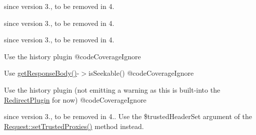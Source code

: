 \begin{DoxyRefList}
%
since version 3., to be removed in 4.  
\item[Global \mbox{\hyperlink{class_symfony_1_1_component_1_1_http_foundation_1_1_request_a10a88bbb830865340337c6251fcff536}{Request\+::HEADER\+\_\+\+CLIENT\+\_\+\+PORT}} ]\label{deprecated__deprecated000050}%
%
since version 3., to be removed in 4.  
\item[Global \mbox{\hyperlink{class_symfony_1_1_component_1_1_http_foundation_1_1_request_a4206c7bb61ac73bacb266c36d68b5c94}{Request\+::HEADER\+\_\+\+CLIENT\+\_\+\+PROTO}} ]\label{deprecated__deprecated000049}%
%
since version 3., to be removed in 4.  
\item[Global \mbox{\hyperlink{class_guzzle_1_1_http_1_1_message_1_1_request_ad698db94bdfd49c67d2a3ed2d0999908}{Request\+::is\+Redirect}} ()]\label{deprecated__deprecated000022}%
%
Use the history plugin @code\+Coverage\+Ignore  
\item[Global \mbox{\hyperlink{class_guzzle_1_1_http_1_1_message_1_1_request_a08d0890b6d6edb6dd52b9475419fe02a}{Request\+::is\+Response\+Body\+Repeatable}} ()]\label{deprecated__deprecated000019}%
%
Use \mbox{\hyperlink{class_guzzle_1_1_http_1_1_message_1_1_request_a3b281d7d3f81e1ea52300b3031051eda}{get\+Response\+Body()}}-\/$>$is\+Seekable() @code\+Coverage\+Ignore  
\item[Global \mbox{\hyperlink{class_guzzle_1_1_http_1_1_message_1_1_request_a3cb6a7a09f3b9cdaef5b75fc7c853ed4}{Request\+::set\+Is\+Redirect}} (\$is\+Redirect)]\label{deprecated__deprecated000021}%
%
Use the history plugin (not emitting a warning as this is built-\/into the \mbox{\hyperlink{class_guzzle_1_1_http_1_1_redirect_plugin}{Redirect\+Plugin}} for now) @code\+Coverage\+Ignore  
\item[Global \mbox{\hyperlink{class_symfony_1_1_component_1_1_http_foundation_1_1_request_a164c0315d220b9a766142151388bdace}{Request\+::set\+Trusted\+Header\+Name}} (\$key, \$value)]\label{deprecated__deprecated000053}%
%
since version 3., to be removed in 4.. Use the \$trusted\+Header\+Set argument of the \mbox{\hyperlink{class_symfony_1_1_component_1_1_http_foundation_1_1_request_ab52066aa50b4b7af4ec53b29ec3d5ffb}{Request\+::set\+Trusted\+Proxies()}} method instead.  
\item[Class \mbox{\hyperlink{class_guzzle_1_1_service_1_1_resource_1_1_resource_iterator_apply_batched}{Resource\+Iterator\+Apply\+Batched}} ]\label{deprecated__deprecated000033}%

\end{DoxyRefList}
